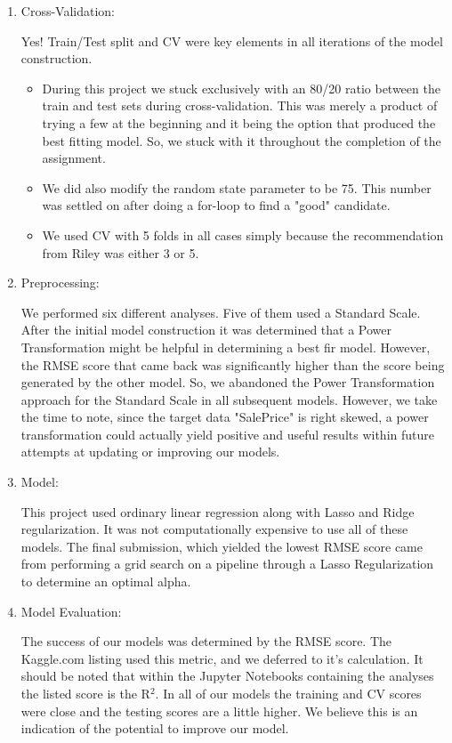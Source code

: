 \documentclass[10pt]{article}
\begin{document}
\begin{enumerate}[\null]
\item Cross-Validation:

\hspace{5mm} Yes!  Train/Test split and CV were key elements in all iterations of the model construction.
\begin{itemize}
\item During this project we stuck exclusively with an 80/20 ratio between the train and test sets during cross-validation.  This was merely a product of trying a few at the beginning and it being the option that produced the best fitting model.  So, we stuck with it throughout the completion of the assignment.
\item We did also modify the random state parameter to be 75.  This number was settled on after doing a for-loop to find a "good" candidate. 

\item We used CV with 5 folds in all cases simply because the recommendation from Riley was either 3 or 5.  
\end{itemize}

\item Preprocessing:

\hspace{5mm} We performed six different analyses.  Five of them used a Standard Scale. After the initial model construction it was determined that a Power Transformation might be helpful in determining a best fir model.  However, the RMSE score that came back was significantly higher than the score being generated by the other model.  So, we abandoned the Power Transformation approach for the Standard Scale in all subsequent models.  However, we take the time to note, since the target data "SalePrice" is right skewed, a power transformation could actually yield positive and useful results within future attempts at updating or improving our models.

\item Model:

\hspace{5mm} This project used ordinary linear regression along with Lasso and Ridge regularization.  It was not computationally expensive to use all of these models.  The final submission, which yielded the lowest RMSE score came from performing a grid search on a pipeline through a Lasso Regularization to determine an optimal alpha.  
            
\item Model Evaluation:

\hspace{5mm} The success of our models was determined by the RMSE score.  The Kaggle.com listing used this metric, and we deferred to it's calculation.  It should be noted that within the Jupyter Notebooks containing the analyses the listed score is the R$^2$.  In all of our models the training and CV scores were close and the testing scores are a little higher.  We believe this is an indication of the potential to improve our model.  


\end{enumerate}
\end{document}
